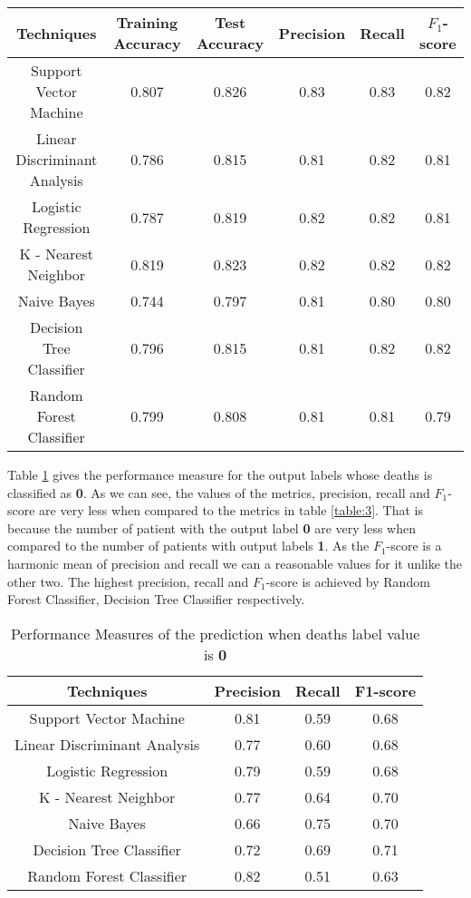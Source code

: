\documentclass[conference]{IEEEtran}
\begin{document}
\begin{table*}[htb]
\centering
 \begin{tabular}{|c| c c c c c|} 
 \hline
 Techniques & Training 		Accuracy & Test 	Accuracy & Precision & Recall & $F_1$-score \\ [0.5ex] 
 \hline
 Support Vector Machine & 0.807 & 0.826 & 0.83 & 0.83 & 0.82\\ 
 \hline
 Linear Discriminant Analysis & 0.786 & 0.815 & 0.81 & 0.82 & 0.81\\
 \hline
 Logistic Regression & 0.787 & 0.819 & 0.82 & 0.82 & 0.81\\
 \hline
 K - Nearest Neighbor & 0.819 & 0.823 & 0.82 & 0.82 & 0.82\\
 \hline
 Naive Bayes & 0.744 & 0.797 & 0.81 & 0.80 & 0.80\\  
 \hline
 Decision Tree Classifier & 0.796 & 0.815 & 0.81 & 0.82 & 0.82 \\
 \hline
 Random Forest Classifier & 0.799 & 0.808 & 0.81 & 0.81 & 0.79 \\[0.5ex] 
 \hline
\end{tabular}
\vspace*{0.25cm}
\caption{Model Performance of Algorithms}
\label{table:1}
\end{table*}

Table \ref{table:2} gives the performance measure for the output labels whose deaths is classified as \textbf{0}. As we can see, the values of the metrics, precision, recall and $F_1$-score are very less when compared to the metrics in table \ref{table:3}. That is because the number of patient with the output label \textbf{0} are very less when compared to the number of patients with output labels \textbf{1}. As the  $F_1$-score is a harmonic mean of precision and recall we can a reasonable values for it unlike the other two. The highest precision, recall and $F_1$-score is achieved by Random Forest Classifier, Decision Tree Classifier respectively. 
\begin{table}[H]
\centering
 \begin{tabular}{|c| c c c|} 
 \hline
 Techniques  & Precision & Recall & F1-score \\ [0.5ex] 
 \hline
 Support Vector Machine & 0.81 & 0.59 & 0.68 \\ 
 \hline
 Linear Discriminant Analysis & 0.77 & 0.60 & 0.68\\
 \hline
 Logistic Regression & 0.79 & 0.59 & 0.68\\
 \hline
 K - Nearest Neighbor & 0.77 & 0.64 & 0.70\\
 \hline
 Naive Bayes & 0.66 & 0.75 & 0.70\\  
 \hline
 Decision Tree Classifier & 0.72 & 0.69 & 0.71 \\
 \hline
 Random Forest Classifier & 0.82 & 0.51 & 0.63  \\[0.75ex] 
 \hline
\end{tabular}
\vspace*{0.25cm}
\caption{Performance Measures of the prediction when deaths label value is \textbf{0}}
\label{table:2}
\end{table}
\end{document}
